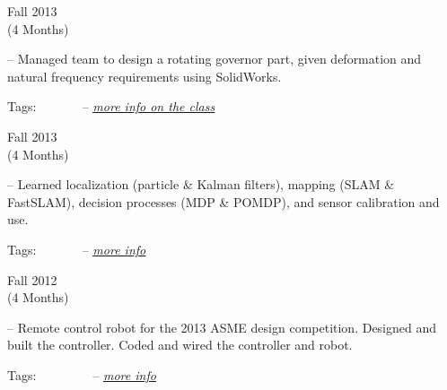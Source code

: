 
\flushleft \begin{minipage}[t]{\dateColWidth}
Fall 2013 \\
(4 Months)
\end{minipage}
\begin{minipage}[t]{0.8\textwidth}
	--
	Managed team to design a rotating governor part, given deformation and natural frequency requirements using SolidWorks. 
	
	Tags:
	 \vline\ 
	 \vline\
	 \vline\
	 \vline\
	--
	\href{http://claytonketner.com/cad-at-a-glance/}{\uline{\textit{more info on the class}}}
\end{minipage}

\divLine

\flushleft \begin{minipage}[t]{\dateColWidth}
Fall 2013 \\
(4 Months)
\end{minipage}
\begin{minipage}[t]{0.8\textwidth}
	--
	Learned localization (particle \& Kalman filters), mapping (SLAM \& FastSLAM), decision processes (MDP \& POMDP), and sensor calibration and use.
	
	Tags:
	 \vline\
	 \vline\
	 \vline\
	 \vline\
	--
	\href{http://claytonketner.com/intro-to-robotics-class}{\uline{\textit{more info}}}
\end{minipage}

\divLine

\flushleft \begin{minipage}[t]{\dateColWidth}
Fall 2012 \\
(4 Months)
\end{minipage}
\begin{minipage}[t]{0.8\textwidth}
	--
	Remote control robot for the 2013 ASME design competition. Designed and built the controller. Coded and wired the controller and robot.

	Tags:
	 \vline\ 
	 \vline\ 
	 \vline\ 
	 \vline\ 
	 \vline\ 
	--
	\href{http://www.claytonketner.com/senior-project-robot/}{\uline{\textit{more info}}}
\end{minipage}

